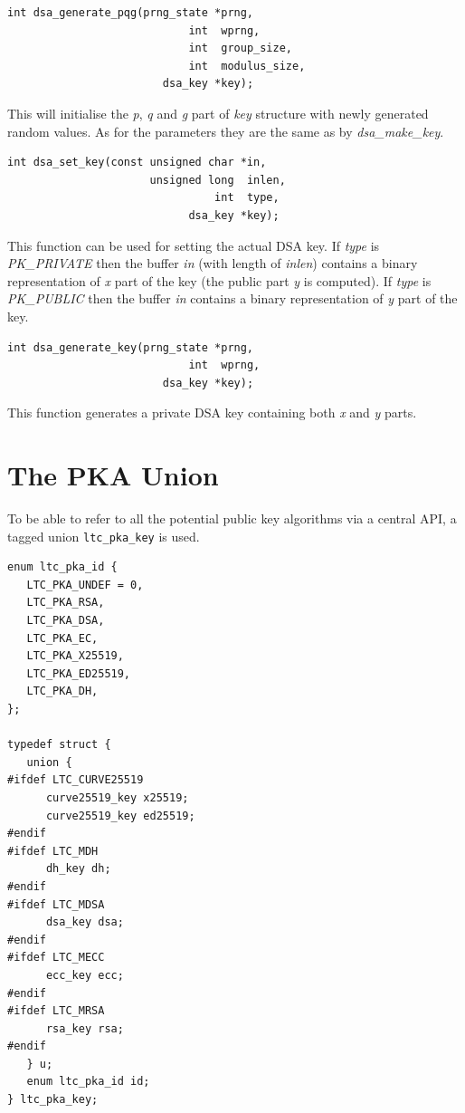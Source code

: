 \documentclass[synpaper]{book}
\begin{document}
\begin{verbatim}
int dsa_generate_pqg(prng_state *prng,
                            int  wprng,
                            int  group_size,
                            int  modulus_size,
                        dsa_key *key);
\end{verbatim}

This will initialise the \textit{p}, \textit{q} and \textit{g} part of \textit{key} structure with newly generated random values.
As for the parameters they are the same as by \textit{dsa\_make\_key}.

\begin{verbatim}
int dsa_set_key(const unsigned char *in,
                      unsigned long  inlen,
                                int  type,
                            dsa_key *key);
\end{verbatim}

This function can be used for setting the actual DSA key. If \textit{type} is \textit{PK\_PRIVATE} then the buffer \textit{in}
(with length of \textit{inlen}) contains a binary representation of \textit{x} part of the key (the public part \textit{y} is computed).
If \textit{type} is \textit{PK\_PUBLIC} then the buffer \textit{in} contains a binary representation of \textit{y} part of the key.

\begin{verbatim}
int dsa_generate_key(prng_state *prng,
                            int  wprng,
                        dsa_key *key);
\end{verbatim}

This function generates a private DSA key containing both \textit{x} and \textit{y} parts.

\chapter{The PKA Union}

To be able to refer to all the potential public key algorithms via a central API,
a tagged union \texttt{ltc\_pka\_key} is used.

\begin{small}
\begin{verbatim}
enum ltc_pka_id {
   LTC_PKA_UNDEF = 0,
   LTC_PKA_RSA,
   LTC_PKA_DSA,
   LTC_PKA_EC,
   LTC_PKA_X25519,
   LTC_PKA_ED25519,
   LTC_PKA_DH,
};

typedef struct {
   union {
#ifdef LTC_CURVE25519
      curve25519_key x25519;
      curve25519_key ed25519;
#endif
#ifdef LTC_MDH
      dh_key dh;
#endif
#ifdef LTC_MDSA
      dsa_key dsa;
#endif
#ifdef LTC_MECC
      ecc_key ecc;
#endif
#ifdef LTC_MRSA
      rsa_key rsa;
#endif
   } u;
   enum ltc_pka_id id;
} ltc_pka_key;
\end{verbatim}
\end{small}
\end{document}
